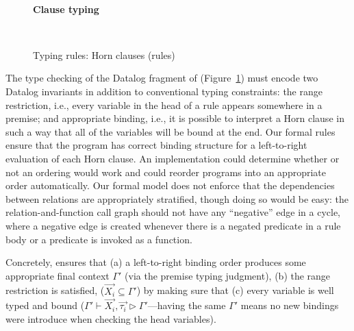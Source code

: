 \documentclass[acmsmall,screen,nonacm]{acmart}
\newcommand{\hdr}[2]{%
\flushleft
\textbf{#1} \hfill {#2} \\
\centering
}
\theoremstyle{definition}
\begin{document}
\begin{figure}[t]


  ~ \\[0.5em]

  \hdr{Clause typing}{
    \quad \fbox{$\implicit{\Delta; \Phi}  \vdash H$}
  }
  
  ~ \\[0.5em]
  

  \caption{Typing rules: Horn clauses (rules)}
  \label{fig:types-rules}
\end{figure}

The type checking of the Datalog fragment of \Name
(Figure~\ref{fig:types-rules}) must encode two Datalog invariants in
addition to conventional typing constraints: the range restriction,
i.e., every variable in the head of a rule appears somewhere in a
premise; and appropriate binding, i.e., it is possible to interpret a
Horn clause in such a way that all of the variables will be bound at
the end.
%
Our formal rules ensure that the program has correct binding structure
for a left-to-right evaluation of each Horn clause. An implementation
could determine whether or not an ordering would work and could reorder
programs into an appropriate order automatically.
%
Our formal model does not enforce that the dependencies between relations are
appropriately stratified, though doing so would be easy:
the relation-and-function call graph should not have any ``negative'' edge in a
cycle, where a negative edge is created whenever there is a negated predicate
in a rule body or a predicate is invoked as a function.

Concretely,  ensures that (a) a left-to-right binding
order produces some appropriate final context $\Gamma'$ (via the
premise typing judgment), (b) the range restriction is satisfied,
($\vec{X_i} \subseteq \Gamma'$) by making sure that (c) every variable
is well typed and bound
($\Gamma' \vdash \vec{X_i},\vec{\tau_i} \rhd \Gamma'$---having the
same $\Gamma'$ means no new bindings were introduce when checking the
head variables).
\end{document}

